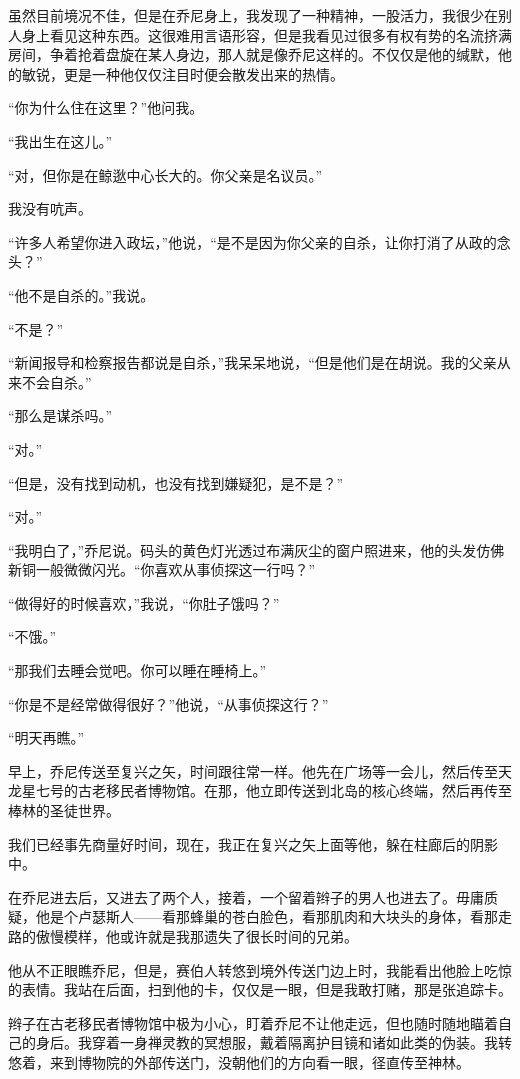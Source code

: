 \documentclass[AutoFakeBold=true]{book}
\begin{document}
虽然目前境况不佳，但是在乔尼身上，我发现了一种精神，一股活力，我很少在别人身上看见这种东西。这很难用言语形容，但是我看见过很多有权有势的名流挤满房间，争着抢着盘旋在某人身边，那人就是像乔尼这样的。不仅仅是他的缄默，他的敏锐，更是一种他仅仅注目时便会散发出来的热情。

``你为什么住在这里？''他问我。

``我出生在这儿。''

``对，但你是在鲸逖中心长大的。你父亲是名议员。''

我没有吭声。

``许多人希望你进入政坛，''他说，``是不是因为你父亲的自杀，让你打消了从政的念头？''

``他不是自杀的。''我说。

``不是？''

``新闻报导和检察报告都说是自杀，''我呆呆地说，``但是他们是在胡说。我的父亲从来不会自杀。''

``那么是谋杀吗。''

``对。''

``但是，没有找到动机，也没有找到嫌疑犯，是不是？''

``对。''

``我明白了，''乔尼说。码头的黄色灯光透过布满灰尘的窗户照进来，他的头发仿佛新铜一般微微闪光。``你喜欢从事侦探这一行吗？''

``做得好的时候喜欢，''我说，``你肚子饿吗？''

``不饿。''

``那我们去睡会觉吧。你可以睡在睡椅上。''

``你是不是经常做得很好？''他说，``从事侦探这行？''

``明天再瞧。''

\vspace*{1em}

早上，乔尼传送至复兴之矢，时间跟往常一样。他先在广场等一会儿，然后传至天龙星七号的古老移民者博物馆。在那，他立即传送到北岛的核心终端，然后再传至棒林的圣徒世界。

我们已经事先商量好时间，现在，我正在复兴之矢上面等他，躲在柱廊后的阴影中。

在乔尼进去后，又进去了两个人，接着，一个留着辫子的男人也进去了。毋庸质疑，他是个卢瑟斯人——看那蜂巢的苍白脸色，看那肌肉和大块头的身体，看那走路的傲慢模样，他或许就是我那遗失了很长时间的兄弟。

他从不正眼瞧乔尼，但是，赛伯人转悠到境外传送门边上时，我能看出他脸上吃惊的表情。我站在后面，扫到他的卡，仅仅是一眼，但是我敢打赌，那是张追踪卡。

辫子在古老移民者博物馆中极为小心，盯着乔尼不让他走远，但也随时随地瞄着自己的身后。我穿着一身禅灵教的冥想服，戴着隔离护目镜和诸如此类的伪装。我转悠着，来到博物院的外部传送门，没朝他们的方向看一眼，径直传至神林。
\end{document}
